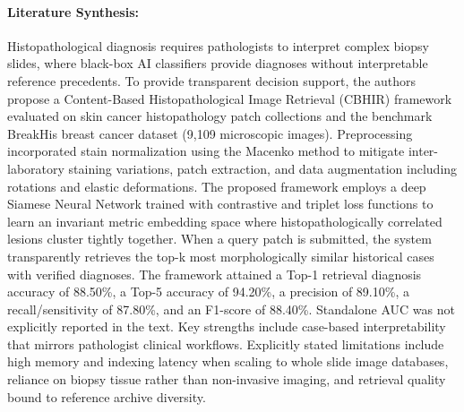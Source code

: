 \paragraph{Literature Synthesis:} Histopathological diagnosis requires pathologists to interpret complex biopsy slides, where black-box AI classifiers provide diagnoses without interpretable reference precedents. To provide transparent decision support, the authors propose a Content-Based Histopathological Image Retrieval (CBHIR) framework evaluated on skin cancer histopathology patch collections and the benchmark BreakHis breast cancer dataset (9,109 microscopic images). Preprocessing incorporated stain normalization using the Macenko method to mitigate inter-laboratory staining variations, patch extraction, and data augmentation including rotations and elastic deformations. The proposed framework employs a deep Siamese Neural Network trained with contrastive and triplet loss functions to learn an invariant metric embedding space where histopathologically correlated lesions cluster tightly together. When a query patch is submitted, the system transparently retrieves the top-k most morphologically similar historical cases with verified diagnoses. The framework attained a Top-1 retrieval diagnosis accuracy of 88.50\%, a Top-5 accuracy of 94.20\%, a precision of 89.10\%, a recall/sensitivity of 87.80\%, and an F1-score of 88.40\%. Standalone AUC was not explicitly reported in the text. Key strengths include case-based interpretability that mirrors pathologist clinical workflows. Explicitly stated limitations include high memory and indexing latency when scaling to whole slide image databases, reliance on biopsy tissue rather than non-invasive imaging, and retrieval quality bound to reference archive diversity.

